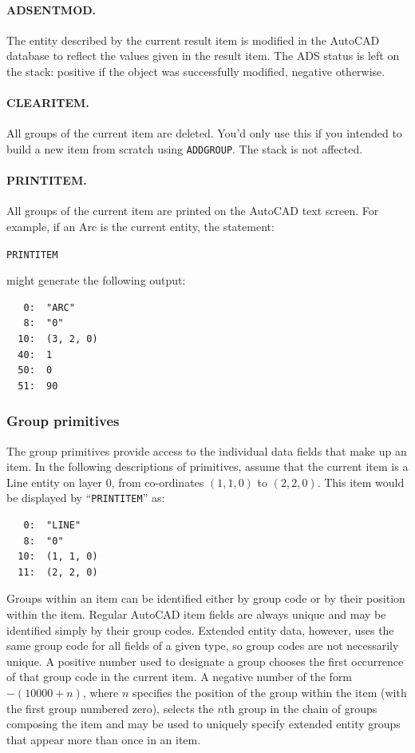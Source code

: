 \documentclass{article}
\begin{document}
\paragraph{ADS\underline{\hspace{0.5em}}ENTMOD.}  The entity described
by the current result item is modified in the AutoCAD database to
reflect the values given in the result item.  The ADS status is left
on the stack: positive if the object was successfully modified,
negative otherwise.

\paragraph{CLEARITEM.}  All groups of the current item are deleted.
You'd only use this if you intended to build a new item from scratch
using {\tt ADDGROUP}.  The stack is not affected.

\paragraph{PRINTITEM.}  All groups of the current item are printed on
the AutoCAD text screen.
For example, if an Arc is the
current entity, the statement:

{\tt PRINTITEM}

might generate the following output:

\begin{verbatim}
   0:  "ARC"
   8:  "0"
  10:  (3, 2, 0)
  40:  1
  50:  0
  51:  90
\end{verbatim}

\subsubsection{Group primitives}
The group primitives provide access to the individual data fields that
make up an item.  In the following descriptions of primitives, assume
that the current item is a Line entity on layer 0, from co-ordinates
$(1,1,0)$ to $(2,2,0)$.  This item would be displayed by
``{\tt PRINTITEM}'' as:

\begin{verbatim}
   0:  "LINE"
   8:  "0"
  10:  (1, 1, 0)
  11:  (2, 2, 0)
\end{verbatim}

Groups within an item can be identified either by group code or by
their position within the item.  Regular AutoCAD item fields are
always unique and may be identified simply by their group codes.
Extended entity data, however, uses the same group code for all fields
of a given type, so group codes are not necessarily unique.  A
positive number used to designate a group chooses the first occurrence
of that group code in the current item.  A negative number of the form
$-(10000+n)$, where $n$ specifies the position of the group
within the item (with the first group numbered zero), selects the $n$th
group in the chain of groups composing the item and may be used to
uniquely specify extended entity groups that appear more than once in
an item.
\end{document}

